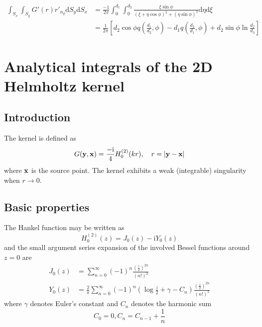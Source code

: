 \documentclass[a4paper,11pt]{article}
\newcommand{\td}{\mathrm{d}}
\newcommand{\ti}{\mathrm{i}}
\begin{document}
\begin{align}
\int_{S_{x}} \int_{S_{y}} G'(r) r'_{n_{y}} \td S_y \td S_x
&=
\frac{-1}{2\pi}\int_{0}^{d_1} \int_{0}^{d_2}
\frac{\xi\sin\phi}{(\xi+\eta \cos\phi)^2 + (\eta\sin\phi)^2}
\td \eta \td \xi \nonumber \\
&=
\frac{1}{2\pi}\left[
	d_2 \cos\phi q\left(\frac{d_1}{d_2}, \phi\right)
	- d_1 q\left(\frac{d_2}{d_1}, \phi\right)
	+ d_2 \sin\phi \ln \frac{d_2}{d_3}
\right]
\end{align}



\section {Analytical integrals of the 2D Helmholtz kernel}

\subsection{Introduction}

The kernel is defined as
%
\begin{equation}
G({\bf y}, {\bf x}) = \frac{-\ti}{4} H_0^{(2)}(kr), \quad r = |{\bf y} - {\bf x}|
\end{equation}
%
where ${\bf x}$ is the source point. The kernel exhibits a weak (integrable) singularity when $r \to 0$.

\subsection{Basic properties}

The Hankel function may be written as
%
\begin{equation}
H_0^{(2)}(z) = J_0(z) - \ti Y_0(z)
\end{equation}
%
and the small argument series expansion of the involved Bessel functions around $z=0$ are
%
\begin{align}
J_0(z) &= \sum_{n=0}^{\infty} (-1)^n \frac{\left(\frac{z}{2}\right)^{2n}}{\left(n!\right)^2} \\
Y_0(z) &= \frac{2}{\pi}
\sum_{n=0}^{\infty} (-1)^n \left(\log \frac{z}{2} + \gamma - C_n \right) \frac{\left(\frac{z}{2}\right)^{2n}}{\left(n!\right)^2}
\end{align}
%
where $\gamma$ denotes Euler's constant and $C_n$ denotes the harmonic sum
%
\begin{equation}
C_0 = 0, C_n = C_{n-1} + \frac{1}{n}
\end{equation}
\end{document}

